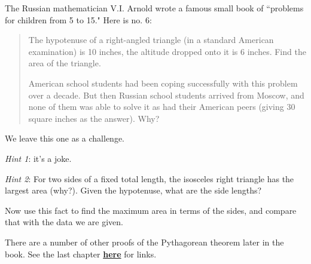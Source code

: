 \documentclass[11pt, oneside]{article}
\begin{document}
The Russian mathematician V.I. Arnold wrote a famous small book of ``problems for children from 5 to 15."  Here is no. 6:

\begin{quote}
The hypotenuse of a right-angled triangle (in a standard American examination) is 10 inches, the altitude dropped onto it is 6 inches. Find the area of the triangle.

American school students had been coping successfully with this problem over a decade. But then Russian school students arrived from Moscow, and none of them was able to solve it as had their American peers (giving 30 square inches as the answer). Why?
\end{quote}

We leave this one as a challenge.  

\emph{Hint 1}:  it's a joke.

\emph{Hint 2}:  For two sides of a fixed total length, the isosceles right triangle has the largest area (why?).  Given the hypotenuse, what are the side lengths?

Now use this fact to find the maximum area in terms of the sides, and compare that with the data we are given.


There are a number of other proofs of the Pythagorean theorem later in the book.  See the last chapter \hyperref[sec:list_Pythagorean_proofs]{\textbf{here}} for links.

  
\end{document}
